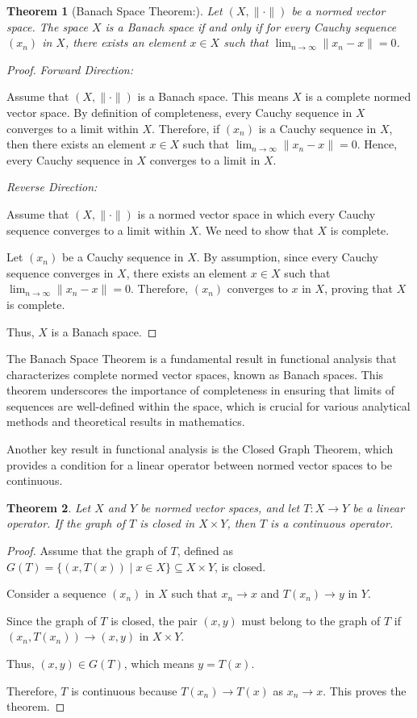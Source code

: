 \documentclass[12pt, reqno]{amsart}
\newtheorem{theorem}{Theorem}[section]
\theoremstyle{definition}
\numberwithin{equation}{section}
\begin{document}
\begin{theorem} [Banach Space Theorem:] 
Let $ (X, \|\cdot\|) $ be a normed vector space. The space $ X $ is a Banach space if and only if for every Cauchy sequence $ (x_n) $ in $ X $, there exists an element $ x \in X $ such that $ \lim_{n \to \infty} \|x_n - x\| = 0 $.
\end{theorem}
\begin{proof}
\textit{Forward Direction:} 

Assume that $ (X, \|\cdot\|) $ is a Banach space. This means $ X $ is a complete normed vector space. By definition of completeness, every Cauchy sequence in $ X $ converges to a limit within $ X $. Therefore, if $ (x_n) $ is a Cauchy sequence in $ X $, then there exists an element $ x \in X $ such that $ \lim_{n \to \infty} \|x_n - x\| = 0 $. Hence, every Cauchy sequence in $ X $ converges to a limit in $ X $.

\textit{Reverse Direction:} 

Assume that $ (X, \|\cdot\|) $ is a normed vector space in which every Cauchy sequence converges to a limit within $ X $. We need to show that $ X $ is complete.

Let $ (x_n) $ be a Cauchy sequence in $ X $. By assumption, since every Cauchy sequence converges in $ X $, there exists an element $ x \in X $ such that $ \lim_{n \to \infty} \|x_n - x\| = 0 $. Therefore, $ (x_n) $ converges to $ x $ in $ X $, proving that $ X $ is complete.

Thus, $ X $ is a Banach space.
\end{proof}
The Banach Space Theorem is a fundamental result in functional analysis that characterizes complete normed vector spaces, known as Banach spaces. This theorem underscores the importance of completeness in ensuring that limits of sequences are well-defined within the space, which is crucial for various analytical methods and theoretical results in mathematics.

Another key result in functional analysis is the Closed Graph Theorem, which provides a condition for a linear operator between normed vector spaces to be continuous.
\begin{theorem}
Let $ X $ and $ Y $ be normed vector spaces, and let $ T: X \to Y $ be a linear operator. If the graph of $ T $ is closed in $ X \times Y $, then $ T $ is a continuous operator.
\end{theorem}

\begin{proof}
Assume that the graph of $ T $, defined as $ G(T) = \{ (x, T(x)) \mid x \in X \} \subseteq X \times Y $, is closed. 

Consider a sequence $ (x_n) $ in $ X $ such that $ x_n \to x $ and $ T(x_n) \to y $ in $ Y $.

Since the graph of $ T $ is closed, the pair $ (x, y) $ must belong to the graph of $ T $ if $ (x_n, T(x_n)) \to (x, y) $ in $ X \times Y $.

Thus, $ (x, y) \in G(T) $, which means $ y = T(x) $.

Therefore, $ T $ is continuous because $ T(x_n) \to T(x) $ as $ x_n \to x $. This proves the theorem.
\end{proof}
\end{document}
